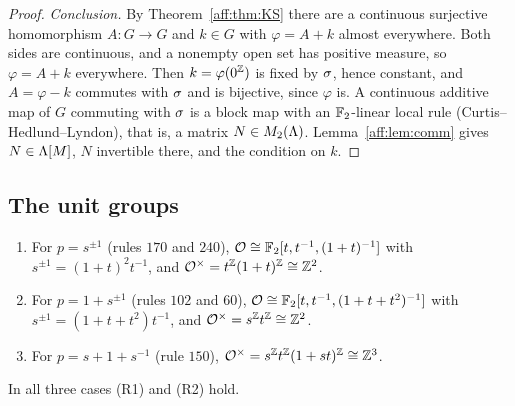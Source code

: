 \begin{proof}
\emph{Conclusion.} By Theorem~\ref{aff:thm:KS} there are a continuous surjective homomorphism $A\colon G\to G$ and $k\in G$ with $\varphi=A+k$ almost everywhere. Both sides are continuous, and a nonempty open set has positive measure, so $\varphi=A+k$ everywhere. Then $k=\varphi(0^{\mathbb{Z}})$ is fixed by $\sigma$, hence constant, and $A=\varphi-k$ commutes with $\sigma$ and is bijective, since $\varphi$ is. A continuous additive map of $G$ commuting with $\sigma$ is a block map with an $\mathbb{F}_2$-linear local rule (Curtis--Hedlund--Lyndon), that is, a matrix $N\in M_2(\Lambda)$. Lemma~\ref{aff:lem:comm} gives $N\in\Lambda[M]$, $N$ invertible there, and the condition on $k$.
\end{proof}

\subsection{The unit groups}\label{aff:sec:units}

\begin{lemma}\label{aff:lem:units}
\begin{enumerate}
\item For $p=s^{\pm1}$ \textup{(}rules $170$ and $240$\textup{)}, $\mathcal O\cong\mathbb{F}_2[t,t^{-1},(1+t)^{-1}]$ with $s^{\pm1}=(1+t)^2t^{-1}$, and $\mathcal O^{\times}=t^{\mathbb{Z}}(1+t)^{\mathbb{Z}}\cong\mathbb{Z}^2$.
\item For $p=1+s^{\pm1}$ \textup{(}rules $102$ and $60$\textup{)}, $\mathcal O\cong\mathbb{F}_2[t,t^{-1},(1+t+t^2)^{-1}]$ with $s^{\pm1}=(1+t+t^2)t^{-1}$, and $\mathcal O^{\times}=s^{\mathbb{Z}}t^{\mathbb{Z}}\cong\mathbb{Z}^2$.
\item For $p=s+1+s^{-1}$ \textup{(}rule $150$\textup{)}, $\mathcal O^{\times}=s^{\mathbb{Z}}t^{\mathbb{Z}}(1+st)^{\mathbb{Z}}\cong\mathbb{Z}^3$.
\end{enumerate}
In all three cases \textup{(R1)} and \textup{(R2)} hold.
\end{lemma}

